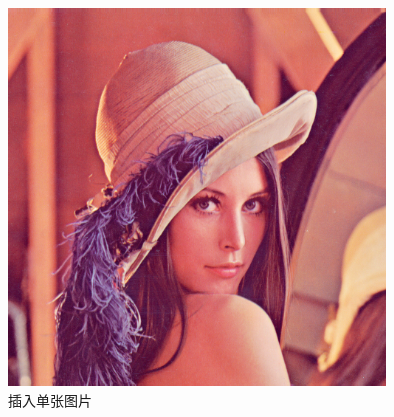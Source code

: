 \begin{figure}[htbp]
\centering
\includegraphics[width=10cm]{img/lena.png}
\caption{插入单张图片}
\label{fig:single}
\end{figure}
